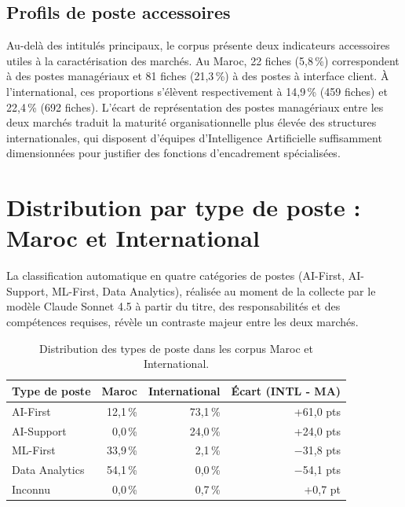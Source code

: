 \documentclass[11pt,a4paper,openany]{report}
\begin{document}
\subsection{Profils de poste accessoires}

Au-del\`a des intitul\'es principaux, le corpus pr\'esente deux indicateurs accessoires utiles \`a la caract\'erisation des march\'es. Au Maroc, 22 fiches (5,8\,\%) correspondent \`a des postes manag\'eriaux et 81 fiches (21,3\,\%) \`a des postes \`a interface client. \`A l'international, ces proportions s'\'el\`event respectivement \`a 14,9\,\% (459 fiches) et 22,4\,\% (692 fiches). L'\'ecart de repr\'esentation des postes manag\'eriaux entre les deux march\'es traduit la maturit\'e organisationnelle plus \'elev\'ee des structures internationales, qui disposent d'\'equipes d'Intelligence Artificielle suffisamment dimensionn\'ees pour justifier des fonctions d'encadrement sp\'ecialis\'ees.

\section{Distribution par type de poste : Maroc et International}

La classification automatique en quatre cat\'egories de postes (AI-First, AI-Support, ML-First, Data Analytics), r\'ealis\'ee au moment de la collecte par le mod\`ele Claude Sonnet 4.5 \`a partir du titre, des responsabilit\'es et des comp\'etences requises, r\'ev\`ele un contraste majeur entre les deux march\'es.

\begin{table}[H]
  \centering
  \caption{Distribution des types de poste dans les corpus Maroc et International.}
  \label{tab:types-postes}
  \begin{tabular}{lrrr}
    \toprule
    \rowcolor{softblue}\textbf{Type de poste} & \textbf{Maroc} & \textbf{International} & \textbf{\'Ecart (INTL - MA)} \\
    \midrule
    AI-First & 12,1\,\% & 73,1\,\% & +61,0 pts \\
    AI-Support & 0,0\,\% & 24,0\,\% & +24,0 pts \\
    ML-First & 33,9\,\% & 2,1\,\% & $-$31,8 pts \\
    Data Analytics & 54,1\,\% & 0,0\,\% & $-$54,1 pts \\
    Inconnu & 0,0\,\% & 0,7\,\% & +0,7 pt \\
    \bottomrule
  \end{tabular}
\end{table}
\end{document}
